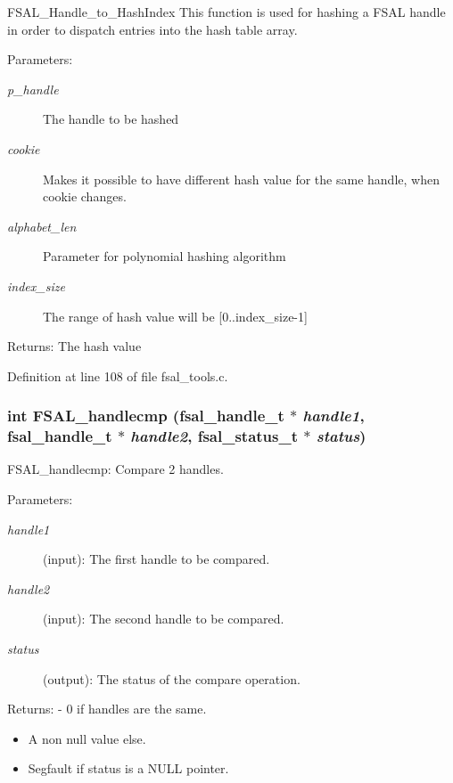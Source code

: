 FSAL\_\-Handle\_\-to\_\-HashIndex This function is used for hashing a FSAL handle in order to dispatch entries into the hash table array.

\begin{Desc}
\item[Parameters:]
\begin{description}
\item[{\em p\_\-handle}]The handle to be hashed \item[{\em cookie}]Makes it possible to have different hash value for the same handle, when cookie changes. \item[{\em alphabet\_\-len}]Parameter for polynomial hashing algorithm \item[{\em index\_\-size}]The range of hash value will be [0..index\_\-size-1]\end{description}
\end{Desc}
\begin{Desc}
\item[Returns:]The hash value \end{Desc}


Definition at line 108 of file fsal\_\-tools.c.
\subsubsection[{FSAL\_\-handlecmp}]{\setlength{\rightskip}{0pt plus 5cm}int FSAL\_\-handlecmp (fsal\_\-handle\_\-t $\ast$ {\em handle1}, \/  fsal\_\-handle\_\-t $\ast$ {\em handle2}, \/  fsal\_\-status\_\-t $\ast$ {\em status})}\label{fsal__tools_8c_808e39546ae8080e331e6d09255d1fc8}


FSAL\_\-handlecmp: Compare 2 handles.

\begin{Desc}
\item[Parameters:]
\begin{description}
\item[{\em handle1}](input): The first handle to be compared. \item[{\em handle2}](input): The second handle to be compared. \item[{\em status}](output): The status of the compare operation.\end{description}
\end{Desc}
\begin{Desc}
\item[Returns:]- 0 if handles are the same.\begin{itemize}
\item A non null value else.\item Segfault if status is a NULL pointer. \end{itemize}
\end{Desc}


